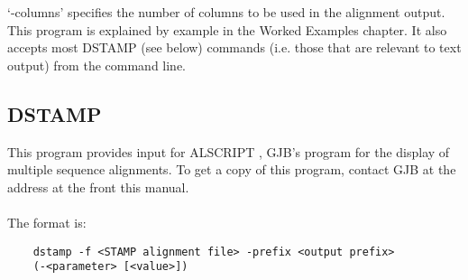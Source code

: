     `-columns' specifies the number of columns to be used in the alignment output.  This
    program is explained by example in the Worked Examples chapter.  It also accepts 
    most DSTAMP (see below) commands (i.e. those that are relevant to text output) from
    the command line.


    \subsection{DSTAMP}

    This program provides input for ALSCRIPT \cite{barton93a}, GJB's program
    for the display of multiple sequence alignments.  To get a copy of
    this program, contact GJB at the address at the front this manual.  \\
    \\
    The format is:\\

    \begin{scriptsize}\begin{verbatim}
    dstamp -f <STAMP alignment file> -prefix <output prefix> 
    (-<parameter> [<value>])
    \end{verbatim} \end{scriptsize}

